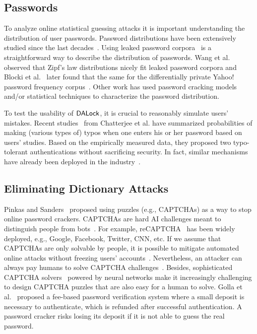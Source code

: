 \subsection{Passwords} \label{related: Passwords}  
\vspace{-0.3cm}
 To analyze online statistical guessing attacks it is important understanding the distribution of user passwords. Password distributions have been extensively studied since the last decades~\cite{FloHer:WWW07,DavKev:WWW12}. Using leaked password corpora~\cite{SP:Bonneau12,Dataset:RockYou} is a straightforward way to describe the distribution of passwords. Wang et al.~\cite{EPRINT:WJHW14,TIFS17:WCWPXG,ESORICS:WanWan16} observed that Zipf's law distributions nicely fit leaked password corpora and Blocki et al.~\cite{SP:BloHarZho18} later found that the same for the differentially private Yahoo! password frequency corpus~\cite{SP:Bonneau12,NDSS:BloDatBon16}. Other work has used password cracking models and/or statistical techniques to characterize the password distribution. 

  To test the usability of $\mathsf{DALock}$, it is crucial to reasonably simulate users' mistakes. Recent studies~\cite{CCS:CWPCR17,SP:CAAJR16} from Chatterjee et al. have summarized probabilities of making (various types of) typos when one enters his or her password based on users' studies. Based on the empirically measured data, they proposed two typo-tolerant authentications without sacrificing security. In fact, similar mechanisms have already been deployed in the industry~\cite{News:AmazonTypo}. 

\vspace*{-\baselineskip}
\subsection{Eliminating Dictionary Attacks} 
\vspace{-0.3cm}

 Pinkas and Sanders~\cite{CCS:PinSan02} proposed using puzzles (e.g., CAPTCHAs) as a way to stop online password crackers. CAPTCHAs are hard AI challenges meant to distinguish people from bots~\cite{EC:vBHL03}. For example, reCAPTCHA~\cite{von2008recaptcha} has been widely deployed, e.g., Google, Facebook, Twitter, CNN, etc. If we assume that CAPTCHAs are only solvable by people, it is possible to mitigate automated online attacks without freezing users' accounts~\cite{SP:BBFNJ10,CCS:BurMarMit11}. Nevertheless, an attacker can always pay humans to solve CAPTCHA challenges~\cite{captchaSolver}. Besides, sophisticated CAPTCHA solvers~\cite{CCS:YTFZFX18} powered by neural networks make it increasingly challenging to design CAPTCHA puzzles that are also easy for a human to solve.  Golla et al.~\cite{SOUPS:GBD17} proposed a fee-based password verification system where a small deposit is necessary to authenticate, which is refunded after successful authentication. A password cracker risks losing its deposit if it is not able to guess the real password.  

